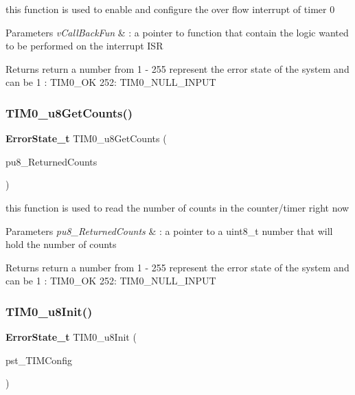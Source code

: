 this function is used to enable and configure the over flow interrupt of timer 0 


\begin{DoxyParams}{Parameters}
{\em v\+Call\+Back\+Fun} & \+: a pointer to function that contain the logic wanted to be performed on the interrupt I\+SR \\
\hline
\end{DoxyParams}
\begin{DoxyReturn}{Returns}
return a number from 1 -\/ 255 represent the error state of the system and can be 1 \+: T\+I\+M0\+\_\+\+OK 252\+: T\+I\+M0\+\_\+\+N\+U\+L\+L\+\_\+\+I\+N\+P\+UT 
\end{DoxyReturn}
\mbox{\label{_t_i_m_e_r0_8c_affaf298d5dadbb9ea2c5b0782b49b30c}} 
\subsubsection{T\+I\+M0\+\_\+u8\+Get\+Counts()}
{\footnotesize\ttfamily \textbf{ Error\+State\+\_\+t} T\+I\+M0\+\_\+u8\+Get\+Counts (\begin{DoxyParamCaption}\item[{\textbf{ uint8\+\_\+t} $\ast$}]{pu8\+\_\+\+Returned\+Counts }\end{DoxyParamCaption})}



this function is used to read the number of counts in the counter/timer right now 


\begin{DoxyParams}{Parameters}
{\em pu8\+\_\+\+Returned\+Counts} & \+: a pointer to a uint8\+\_\+t number that will hold the number of counts \\
\hline
\end{DoxyParams}
\begin{DoxyReturn}{Returns}
return a number from 1 -\/ 255 represent the error state of the system and can be 1 \+: T\+I\+M0\+\_\+\+OK 252\+: T\+I\+M0\+\_\+\+N\+U\+L\+L\+\_\+\+I\+N\+P\+UT 
\end{DoxyReturn}
\mbox{\label{_t_i_m_e_r0_8c_a7411543d6d0d589f6b5fa318bcf59d88}} 
\subsubsection{T\+I\+M0\+\_\+u8\+Init()}
{\footnotesize\ttfamily \textbf{ Error\+State\+\_\+t} T\+I\+M0\+\_\+u8\+Init (\begin{DoxyParamCaption}\item[{\textbf{ T\+I\+M0\+\_\+\+Config\+\_\+t} $\ast$}]{pst\+\_\+\+T\+I\+M\+Config }\end{DoxyParamCaption})}



